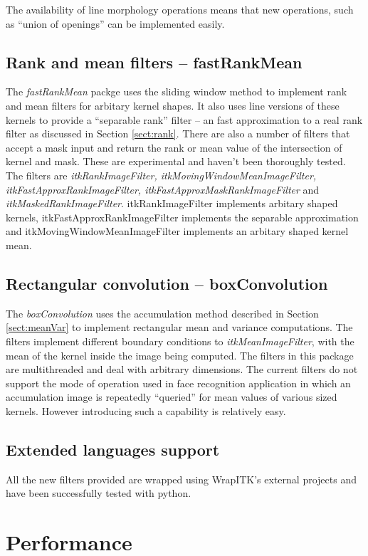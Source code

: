 \documentclass{InsightArticle}
\begin{document}
The availability of line morphology operations means that new
operations, such as ``union of openings'' can be implemented easily.

\subsection{Rank and mean filters -- fastRankMean}
The {\em fastRankMean} packge uses the sliding window method to
implement rank and mean filters for arbitary kernel shapes. It also
uses line versions of these kernels to provide a ``separable rank''
filter -- an fast approximation to a real rank filter as discussed in
Section \ref{sect:rank}. There are also a number of filters that
accept a mask input and return the rank or mean value of the
intersection of kernel and mask. These are experimental and haven't
been thoroughly tested. The filters are {\em itkRankImageFilter,
itkMovingWindowMeanImageFilter, itkFastApproxRankImageFilter,
itkFastApproxMaskRankImageFilter} and {\em
itkMaskedRankImageFilter}. itkRankImageFilter implements arbitary
shaped kernels, itkFastApproxRankImageFilter implements the separable
approximation and itkMovingWindowMeanImageFilter implements an
arbitary shaped kernel mean.

\subsection{Rectangular convolution -- boxConvolution}
The {\em boxConvolution} uses the accumulation method described in
Section \ref{sect:meanVar} to implement rectangular mean and variance
computations. The filters implement different boundary conditions to
{\em itkMeanImageFilter}, with the mean of the kernel inside the image
being computed. The filters in this package are multithreaded and deal
with arbitrary dimensions. The current filters do not support the mode
of operation used in face recognition application in which an
accumulation image is repeatedly ``queried'' for mean values of
various sized kernels. However introducing such a capability is
relatively easy.

\subsection{Extended languages support}

All the new filters provided are wrapped using WrapITK's external projects
\cite{WrapITK} and have been successfully tested with python.

\section{Performance}
\end{document}
